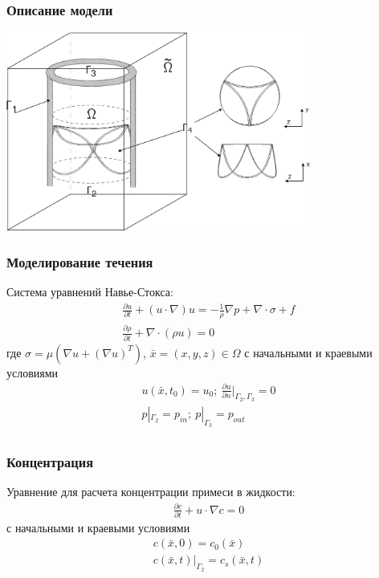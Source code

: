 \documentclass[14pt]{beamer}
\begin{document}
\begin{frame}
\frametitle{Описание модели}
    \begin{center}
        \includegraphics[width=10cm]{aorta_valve_scheme_flat_computation.png}
    \end{center}
\end{frame}

\begin{frame}
\frametitle{Моделирование течения}
Система уравнений Навье-Стокса:
\begin{gather}
    \label{eq:motion}
    \frac{\partial u}{\partial t} + (u \cdot \nabla) u = - \frac{1}{\rho} \nabla p + \nabla \cdot \sigma + f\\
    \label{eq:continuity}
    \frac{\partial \rho}{\partial t} + \nabla \cdot (\rho u) = 0 
\end{gather}
где $\sigma = \mu (\nabla u + (\nabla u)^{T})$, $\bar{x} = (x, y, z) \in \Omega$ с начальными и краевыми условиями
\begin{gather*}
    u(\bar{x}, t_0) = u_0;\ \frac{\partial u}{\partial n}|_{\Gamma_2, \Gamma_3} = 0\\
    p|_{\Gamma_2} = p_{in};\ p|_{\Gamma_3} = p_{out} \\
\end{gather*}

\end{frame}

\begin{frame}
\frametitle{Концентрация}
Уравнение для расчета концентрации примеси в жидкости:
\begin{gather}
    \label{eq:concentration}
    \frac{\partial c}{\partial t} + u \cdot \nabla c = 0
\end{gather}
с начальными и краевыми условиями
\begin{gather*}
    c(\bar{x}, 0) = c_0(\bar{x})\\
    c(\bar{x}, t)|_{\Gamma_2} = c_s(\bar{x}, t)
\end{gather*}

\end{frame}
\end{document}
